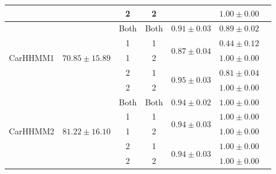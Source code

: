 \begin{table}[]
{\begin{tabular}{ccccccc}
                           &                                    & 2                             & 2                                &                                   & $1.00 \pm 0.00$                       \\ \hline
\multirow{5}{*}{CarHHMM1}  & \multirow{5}{*}{$70.85 \pm 15.89$}   & Both                          & Both                             & $0.91 \pm 0.03$                   & $0.89 \pm 0.02$                       \\
                           &                                    & 1                             & 1                                & \multirow{2}{*}{$0.87\pm0.04$}    & $0.44 \pm 0.12$                       \\ 
                           &                                    & 1                             & 2                                &                                   & $1.00 \pm 0.00$                       \\ 
                           &                                    & 2                             & 1                                & \multirow{2}{*}{$0.95\pm0.03$}    & $0.81 \pm 0.04$                       \\ 
                           &                                    & 2                             & 2                                &                                   & $1.00 \pm 0.00$                       \\ \hline
\multirow{5}{*}{CarHHMM2}  & \multirow{5}{*}{$81.22 \pm 16.10$}   & Both                          & Both                             & $0.94 \pm 0.02$                   & $1.00 \pm 0.00$                       \\
                           &                                    & 1                             & 1                                & \multirow{2}{*}{$0.94\pm0.03$}    & $1.00 \pm 0.00$                       \\ 
                           &                                    & 1                             & 2                                &                                   & $1.00 \pm 0.00$                       \\ 
                           &                                    & 2                             & 1                                & \multirow{2}{*}{$0.94\pm0.03$}    & $1.00 \pm 0.00$                       \\ 
                           &                                    & 2                             & 2                                &                                   & $1.00 \pm 0.00$                       \\ \hline
\end{tabular}
}
\label{table:accuracy}
\end{table}

